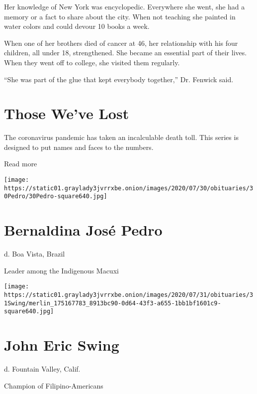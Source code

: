 Her knowledge of New York was encyclopedic. Everywhere she went, she had
a memory or a fact to share about the city. When not teaching she
painted in water colors and could devour 10 books a week.

When one of her brothers died of cancer at 46, her relationship with his
four children, all under 18, strengthened. She became an essential part
of their lives. When they went off to college, she visited them
regularly.

``She was part of the glue that kept everybody together,'' Dr. Fenwick
said.

\href{https://www.nytimes3xbfgragh.onion/interactive/2020/obituaries/people-died-coronavirus-obituaries.html?action=click\&pgtype=Article\&state=default\&region=BELOW_MAIN_CONTENT\&context=covid_obits_promo}{}

\hypertarget{those-weve-lost}{%
\section{Those We've Lost}\label{those-weve-lost}}

The coronavirus pandemic has taken an incalculable death toll. This
series is designed to put names and faces to the numbers.

Read more

\texttt{[image: https://static01.graylady3jvrrxbe.onion/images/2020/07/30/obituaries/30Pedro/30Pedro-square640.jpg]}

\hypertarget{bernaldina-josuxe9-pedro}{%
\section{Bernaldina José Pedro}\label{bernaldina-josuxe9-pedro}}

d. Boa Vista, Brazil

Leader among the Indigenous Macuxi

\texttt{[image: https://static01.graylady3jvrrxbe.onion/images/2020/07/31/obituaries/31Swing/merlin\_175167783\_8913bc90-0d64-43f3-a655-1bb1bf1601c9-square640.jpg]}

\hypertarget{john-eric-swing}{%
\section{John Eric Swing}\label{john-eric-swing}}

d. Fountain Valley, Calif.

Champion of Filipino-Americans

